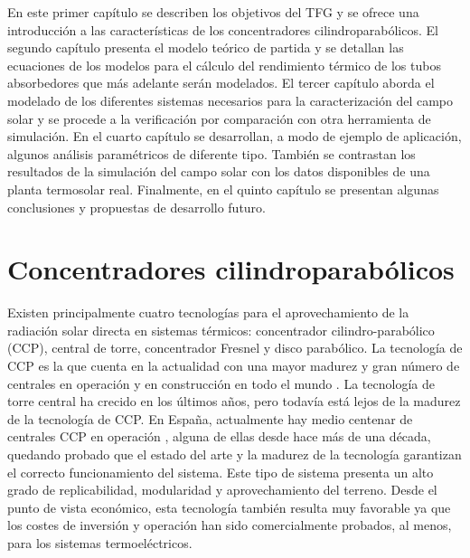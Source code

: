 En este primer capítulo se describen los objetivos del TFG y se ofrece una introducción a las características de los concentradores cilindroparabólicos. 
El segundo capítulo presenta el modelo teórico de partida y se detallan las ecuaciones de los modelos para el cálculo del rendimiento térmico de los tubos absorbedores que más adelante serán modelados.
El tercer capítulo aborda el modelado de los diferentes sistemas necesarios para la caracterización del campo solar y se procede a la verificación por comparación con otra herramienta de simulación.
En el cuarto capítulo se desarrollan, a modo de ejemplo de aplicación, algunos análisis paramétricos de diferente tipo. También se contrastan los resultados de la simulación del campo solar con los datos disponibles de una planta termosolar real.
Finalmente, en el quinto capítulo se presentan algunas conclusiones y propuestas de desarrollo futuro.

\section{Concentradores cilindroparabólicos}

Existen principalmente cuatro tecnologías para el aprovechamiento de la radiación solar directa en sistemas térmicos: concentrador cilindro-parabólico (CCP), central de torre, concentrador Fresnel y disco parabólico. La tecnología de CCP es la que cuenta en la actualidad con una mayor madurez y gran número de centrales en operación y en construcción en todo el mundo \cite{islamComprehensiveReviewStateoftheart2018}. La tecnología de torre central ha crecido en los últimos años, pero todavía está lejos de la madurez de la tecnología de CCP. En España, actualmente hay medio centenar de centrales CCP en operación \cite{Protermosolar}, alguna de ellas desde hace más de una década, quedando probado que el estado del arte y la madurez de la tecnología garantizan el correcto funcionamiento del sistema. Este tipo de sistema presenta un alto grado de replicabilidad, modularidad y aprovechamiento del terreno. Desde el punto de vista económico, esta tecnología también resulta muy favorable ya que los costes de inversión y operación han sido comercialmente probados, al menos, para los sistemas termoeléctricos.

